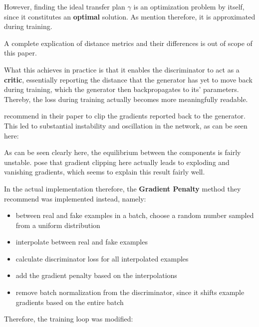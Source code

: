 However, finding the ideal transfer plan $\gamma$ is an optimization problem by itself, since it constitutes an \textbf{optimal} solution. As \cite{arjovsky2017wasserstein} mention therefore, it is approximated during training.

A complete explication of distance metrics and their differences is out of scope of this paper.

What this achieves in practice is that it enables the discriminator to act as a \textbf{critic}, essentially reporting the distance that the generator has yet to move back during training, 
which the generator then backpropagates to its' parameters. Thereby, the loss during training actually becomes more meaningfully readable.

\pagebreak

\cite{arjovsky2017wasserstein} recommend in their paper to clip the gradients reported back to the generator. This led to substantial instability and oscillation in the network, as can be seen here:


As can be seen clearly here, the equilibrium between the components is fairly unstable.
\cite{gulrajani2017improved} pose that gradient clipping here actually leads to exploding and vanishing gradients, which seems to explain this result fairly well. 

In the actual implementation therefore, the \textbf{Gradient Penalty} method they recommend was implemented instead, namely:

\begin{itemize}
	\item between real and fake examples in a batch, choose a random number sampled from a uniform distribution
	\item interpolate between real and fake examples
	\item calculate discriminator loss for all interpolated examples
	\item add the gradient penalty based on the interpolations
	\item remove batch normalization from the discriminator, since it shifts example gradients based on the entire batch
\end{itemize}

\pagebreak

Therefore, the training loop was modified:

